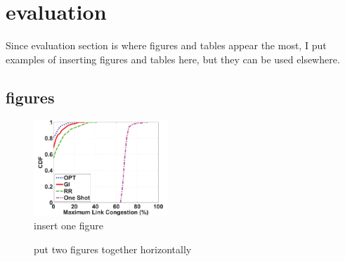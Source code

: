 \section{evaluation}
\label{sec:eva}

Since evaluation section is where figures and tables appear the most, I put examples of inserting figures and tables here, but they can be used elsewhere.

\subsection{figures}

\begin{figure}[H]
\centering
\includegraphics[width=2.0in]{Fig/DCN.pdf}
\caption{insert one figure}
\label{fig:DCN}
\vspace{-3mm}
\end{figure}

\begin{figure}[H]
\caption{put two figures together horizontally} \label{fig:Topology}
\vspace{-1em}
\end{figure}


